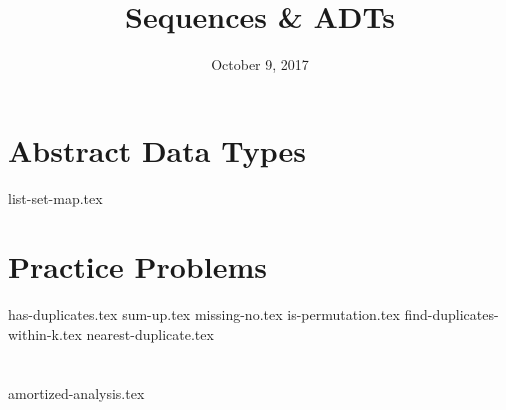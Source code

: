 \documentclass[11pt]{exam}
\title{Sequences \& ADTs}
\date{October 9, 2017}
\begin{document}
\maketitle

\section{Abstract Data Types}
{list-set-map.tex}

\clearpage

\section{Practice Problems}
\begin{questions}
{has-duplicates.tex}
{sum-up.tex}
\clearpage
{missing-no.tex}
{is-permutation.tex}
\clearpage
{find-duplicates-within-k.tex}
{nearest-duplicate.tex}
\end{questions}

\clearpage

\section{}
\begin{questions}
{amortized-analysis.tex}
\end{questions}
\end{document}
